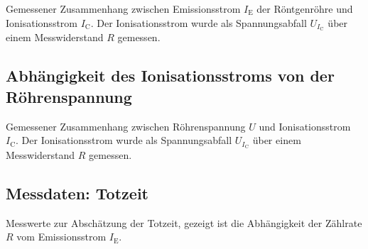 \documentclass[11pt, a4paper]{article}
\numberwithin{equation}{section}
\begin{document}
\begin{appendix}
\begin{table}[hp]
	\vspace{10mm}
	
	\begin{subtable}[c]{0.75\textwidth}
		
		\label{tab:emissionsstrom_cu}
	\end{subtable}	
	\caption{Gemessener Zusammenhang zwischen Emissionsstrom $I_\mathrm{E}$ der Röntgenröhre und Ionisationsstrom $I_\mathrm{C}$. Der Ionisationsstrom wurde als Spannungsabfall $U_{I_\mathrm{C}}$ über einem Messwiderstand $R$ gemessen.}
\end{table}
\FloatBarrier

\subsection{Abhängigkeit des Ionisationsstroms von der Röhrenspannung}
\label{app:ionisationsstrom_roehrenspannung}
\begin{table}[hp]
	\centering
	\begin{subtable}[c]{0.75\textwidth}
		
		\label{tab:roehrenspannung_mo}
	\end{subtable}
	
	\vspace{10mm}
	
	\begin{subtable}[c]{0.75\textwidth}
		
		\label{tab:roehrenspannung_cu}
	\end{subtable}	
	\caption{Gemessener Zusammenhang zwischen Röhrenspannung $U$ und Ionisationsstrom $I_\mathrm{C}$. Der Ionisationsstrom wurde als Spannungsabfall $U_{I_\mathrm{C}}$ über einem Messwiderstand $R$ gemessen.}
\end{table}
\FloatBarrier

\subsection{Messdaten: Totzeit}
\begin{table}[ht]
	\centering
	
	\caption{Messwerte zur Abschätzung der Totzeit, gezeigt ist die Abhängigkeit der Zählrate $R$ vom Emissionsstrom $I_\mathrm{E}$.}
	\label{tab:totzeit}
\end{table}
\FloatBarrier

\end{appendix}
\end{document}
